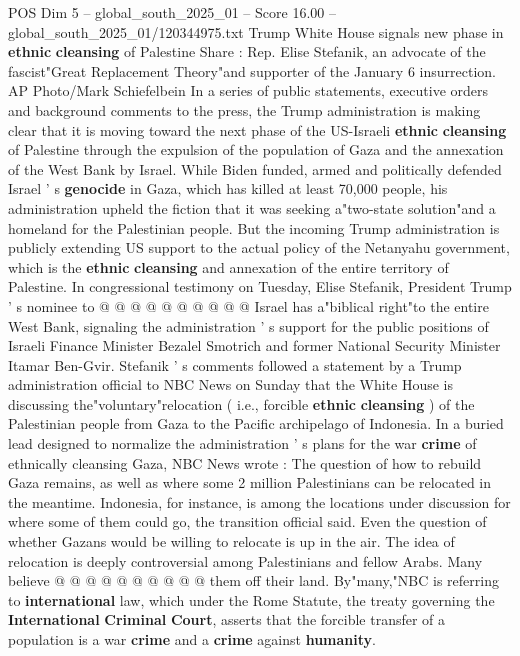\begin{textsample}{POS Dim 5 – global\_south\_2025\_01 – Score 16.00 – global\_south\_2025\_01/120344975.txt}  \label{ex:f5_pos_295}
Trump White House signals new phase in \textbf{ethnic} \textbf{cleansing} of Palestine Share : Rep.
Elise Stefanik, an advocate of the fascist"Great Replacement Theory"and supporter of the January 6 insurrection.
AP Photo/Mark Schiefelbein In a series of public statements, executive orders and background comments to the press, the Trump administration is making clear that it is moving toward the next phase of the US-Israeli \textbf{ethnic} \textbf{cleansing} of Palestine through the expulsion of the population of Gaza and the annexation of the West Bank by Israel.
While Biden funded, armed and politically defended Israel ' s \textbf{genocide} in Gaza, which has killed at least 70,000 people, his administration upheld the fiction that it was seeking a"two-state solution"and a homeland for the Palestinian people.
But the incoming Trump administration is publicly extending US support to the actual policy of the Netanyahu government, which is the \textbf{ethnic} \textbf{cleansing} and annexation of the entire territory of Palestine.
In congressional testimony on Tuesday, Elise Stefanik, President Trump ' s nominee to @ @ @ @ @ @ @ @ @ @ Israel has a"biblical right"to the entire West Bank, signaling the administration ' s support for the public positions of Israeli Finance Minister Bezalel Smotrich and former National Security Minister Itamar Ben-Gvir.
Stefanik ' s comments followed a statement by a Trump administration official to NBC News on Sunday that the White House is discussing the"voluntary"relocation ( i.e., forcible \textbf{ethnic} \textbf{cleansing} ) of the Palestinian people from Gaza to the Pacific archipelago of Indonesia.
In a buried lead designed to normalize the administration ' s plans for the war \textbf{crime} of ethnically cleansing Gaza, NBC News wrote : The question of how to rebuild Gaza remains, as well as where some 2 million Palestinians can be relocated in the meantime.
Indonesia, for instance, is among the locations under discussion for where some of them could go, the transition official said.
Even the question of whether Gazans would be willing to relocate is up in the air.
The idea of relocation is deeply controversial among Palestinians and fellow Arabs.
Many believe @ @ @ @ @ @ @ @ @ @ them off their land.
By"many,"NBC is referring to \textbf{international} law, which under the Rome Statute, the treaty governing the \textbf{International} \textbf{Criminal} \textbf{Court}, asserts that the forcible transfer of a population is a war \textbf{crime} and a \textbf{crime} against \textbf{humanity}.

\end{textsample}

